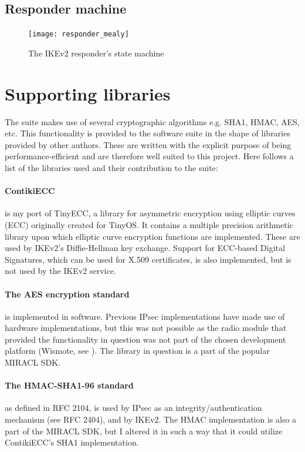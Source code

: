 \documentclass[final,a4paper,twoside,11pt,onecolumn]{report}
\begin{document}
\subsection{Responder machine}

\begin{figure}[h]
   \texttt{[image: responder\_mealy]}
   \caption{The IKEv2 responder's state machine}
   \label{fig:responder-machine}
\end{figure}


\section{Supporting libraries}
The suite makes use of several cryptographic algorithms e.g. SHA1, HMAC, AES, etc. This functionality is provided to the software suite in the shape of libraries provided by other authors. These are written with the explicit purpose of being performance-efficient and are therefore well suited to this project. Here follows a list of the libraries used and their contribution to the suite:

\paragraph{ContikiECC} is my port of TinyECC, a library for asymmetric encryption using elliptic curves (ECC) originally created for TinyOS. It contains a multiple precision arithmetic library upon which elliptic curve encryption functions are implemented. These are used by IKEv2's Diffie-Hellman key exchange. Support for ECC-based Digital Signatures, which can be used for X.509 certificates, is also implemented, but is not used by the IKEv2 service.

\paragraph{The AES encryption standard} is implemented in software. Previous IPsec implementations\cite{raza11securing} have made use of hardware implementations, but this was not possible as the radio module that provided the functionality in question was not part of the chosen development platform (Wismote, see ). The library in question is a part of the popular MIRACL SDK.

\paragraph{The HMAC-SHA1-96 standard} as defined in RFC 2104\cite{rfc2104}, is used by IPsec as an integrity/authentication mechanism (see RFC 2404\cite{rfc2404}), and by IKEv2. The HMAC implementation is also a part of the MIRACL SDK, but I altered it in such a way that it could utilize ContikiECC's SHA1 implementation.
\end{document}
